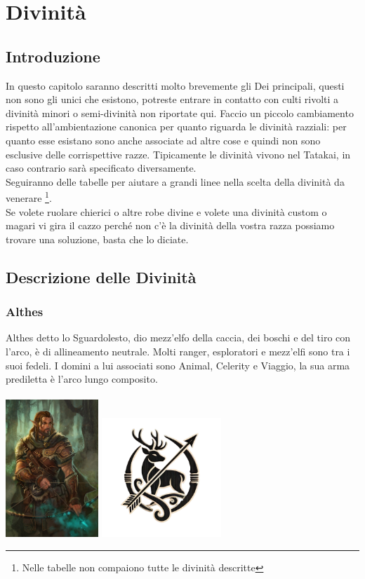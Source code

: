 \documentclass[10pt, a4paper]{report}
\begin{document}
\chapter{Divinità}
\begin{multicols}{2}
\section{Introduzione}
In questo capitolo saranno descritti molto brevemente gli Dei principali, questi non sono gli unici che esistono, potreste entrare in contatto con culti rivolti a divinità minori o semi-divinità non riportate qui.
Faccio un piccolo cambiamento rispetto all'ambientazione canonica per quanto riguarda le divinità razziali: per quanto esse esistano sono anche associate ad altre cose e quindi non sono esclusive delle corrispettive razze. Tipicamente le divinità vivono nel Tatakai, in caso contrario sarà specificato diversamente.\\
Seguiranno delle tabelle per aiutare a grandi linee nella scelta della divinità da venerare \footnote{Nelle tabelle non compaiono tutte le divinità descritte}.\\
Se volete ruolare chierici o altre robe divine e volete una divinità custom o magari vi gira il cazzo perché non c'è la divinità della vostra razza possiamo trovare una soluzione, basta che lo diciate.

\section{Descrizione delle Divinità}
\subsection*{Althes}
Althes detto lo Sguardolesto, dio mezz'elfo della caccia, dei boschi e del tiro con l'arco, è di allineamento neutrale. Molti ranger, esploratori e mezz'elfi sono tra i suoi fedeli. I domini a lui associati sono Animal, Celerity e Viaggio, la sua arma prediletta è l'arco lungo composito.\\
\\
\includegraphics[width = 3.5cm]{althes.png}
\includegraphics[width = 4.5cm]{althes_simbolo.png}

\end{multicols}
\end{document}
